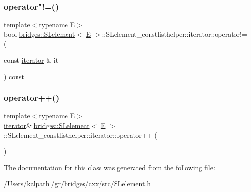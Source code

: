 \mbox{\label{classbridges_1_1_s_lelement_1_1_s_lelement__constlisthelper_1_1iterator_ae0a1715327321142f4f56d729a615a8d}} 
\subsubsection{\texorpdfstring{operator"!=()}{operator!=()}}
{\footnotesize\ttfamily template$<$typename E$>$ \\
bool \mbox{\hyperlink{classbridges_1_1_s_lelement}{bridges\+::\+S\+Lelement}}$<$ \mbox{\hyperlink{namespacebridges_acfb0a4f7877d8f63de3e6862004c50eda3a3ea00cfc35332cedf6e5e9a32e94da}{E}} $>$\+::S\+Lelement\+\_\+constlisthelper\+::iterator\+::operator!= (\begin{DoxyParamCaption}\item[{const \mbox{\hyperlink{classbridges_1_1_s_lelement_1_1_s_lelement__constlisthelper_1_1iterator}{iterator}} \&}]{it }\end{DoxyParamCaption}) const\hspace{0.3cm}{\ttfamily [inline]}}

\mbox{\label{classbridges_1_1_s_lelement_1_1_s_lelement__constlisthelper_1_1iterator_a1de6ed4b50ede98a435fd92ebc318cfb}} 
\subsubsection{\texorpdfstring{operator++()}{operator++()}}
{\footnotesize\ttfamily template$<$typename E$>$ \\
\mbox{\hyperlink{classbridges_1_1_s_lelement_1_1_s_lelement__constlisthelper_1_1iterator}{iterator}}\& \mbox{\hyperlink{classbridges_1_1_s_lelement}{bridges\+::\+S\+Lelement}}$<$ \mbox{\hyperlink{namespacebridges_acfb0a4f7877d8f63de3e6862004c50eda3a3ea00cfc35332cedf6e5e9a32e94da}{E}} $>$\+::S\+Lelement\+\_\+constlisthelper\+::iterator\+::operator++ (\begin{DoxyParamCaption}{ }\end{DoxyParamCaption})\hspace{0.3cm}{\ttfamily [inline]}}



The documentation for this class was generated from the following file\+:\begin{DoxyCompactItemize}
\item 
/\+Users/kalpathi/gr/bridges/cxx/src/\mbox{\hyperlink{_s_lelement_8h}{S\+Lelement.\+h}}\end{DoxyCompactItemize}
